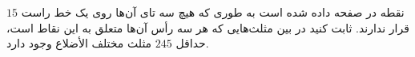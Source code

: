 \p
$15$ 
نقطه در صفحه داده شده است به طوری که هیچ سه تای آن‌ها روی یک خط راست قرار ندارند. ثابت کنید در بین مثلث‌هایی که هر سه رأس آن‌ها متعلق به این نقاط است، حداقل
$245$ 
مثلث مختلف الأضلاع وجود دارد. 